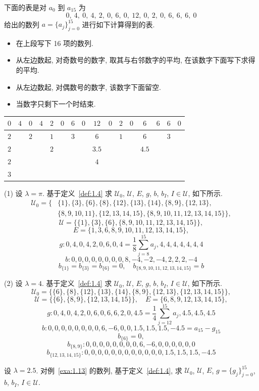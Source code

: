 \begin{example}\label{exa:1.13}
下面的表是对 $a_{0}$ 到 $a_{15}$ 为
\[
0, \ 4, \ 0, \ 4, \ 2, \ 0, \ 6, \ 0, \ 12, \ 0, \ 2, \ 0, \ 6, \ 6, \ 6, \ 0
\]
给出的数列 $a = \{a_{j}\}_{j=0}^{15}$ 进行如下计算得到的表.

\begin{itemize}
\item 在上段写下 16 项的数列.
\item 从左边数起, 对奇数号的数字, 取其与右邻数字的平均, 在该数字下面写下求得的平均.
\item 从左边数起, 对偶数号的数字, 该数字下面留空.
\item 当数字只剩下一个时结束.
\end{itemize}

\begin{center}
\begin{tabular}{cccccccccccccccc}
\hline
$0$ & $4$ & $0$ & $4$ & $2$ & $0$ & $6$ & $0$ & $12$ & $0$ & $2$ & $0$ & $6$ & $6$ & $6$ & $0$ \\
\hline
$2$ &  & $2$ &  & $1$ &  & $3$ &  & $6$ &  & $1$ &  & $6$ &  & $3$ &  \\
\hline
$2$ &  &  &  & $2$ &  &  &  & $3.5$ &  &  &  & $4.5$ &  &  &  \\
\hline
$2$ &  &  &  &  &  &  &  & $4$ &  &  &  &  &  &  &  \\
\hline
$3$ &  &  &  &  &  &  &  &  &  &  &  &  &  &  &  \\
\hline
\end{tabular}
\end{center}

(1) 设 $\lambda = \pi$. 基于定义~\ref{def:1.4} 求 $\mathcal{U}_{0}$, $\mathcal{U}$, $E$, $g$, $b$, $b_{I}$, $I \in \mathcal{U}$, 如下所示.
\begin{align*}
\mathcal{U}_{0} = \{ & \{1\}, \{3\}, \{6\}, \{8\}, \{12\}, \{13\}, \{14\}, \{8,9\}, \{12,13\}, \\
& \{8,9,10,11\}, \{12,13,14,15\}, \{8,9,10,11,12,13,14,15\}\},
\end{align*}
\[
\mathcal{U} = \{\{1\}, \{3\}, \{6\}, \{8,9,10,11,12,13,14,15\}\},
\]
\[
E = \{1, 3, 6, 8, 9, 10, 11, 12, 13, 14, 15\},
\]
\[
g: 0, 4, 0, 4, 2, 0, 6, 0, 4 = \frac{1}{8}\sum_{j=8}^{15} a_{j}, 4, 4, 4, 4, 4, 4, 4
\]
\[
b: 0, 0, 0, 0, 0, 0, 0, 0, 8, -4, -2, -4, 2, 2, 2, -4
\]
\[
b_{\{1\}} = b_{\{3\}} = b_{\{6\}} = 0, \quad b_{\{8,9,10,11,12,13,14,15\}} = b
\]

(2) 设 $\lambda = 4$. 基于定义~\ref{def:1.4} 求 $\mathcal{U}_{0}$, $\mathcal{U}$, $E$, $g$, $b$, $b_{I}$, $I \in \mathcal{U}$, 如下所示.
\[
\mathcal{U}_{0} = \{\{6\}, \{8\}, \{12\}, \{13\}, \{14\}, \{8,9\}, \{12,13\}, \{12,13,14,15\}\},
\]
\[
\mathcal{U} = \{\{6\}, \{8,9\}, \{12,13,14,15\}\}, \quad E = \{6, 8, 9, 12, 13, 14, 15\},
\]
\[
g: 0, 4, 0, 4, 2, 0, 6, 0, 6, 6, 2, 0, 4.5 = \frac{1}{4}\sum_{j=12}^{15} a_{j}, 4.5, 4.5, 4.5
\]
\[
b: 0, 0, 0, 0, 0, 0, 0, 0, 6, -6, 0, 0, 1.5, 1.5, 1.5, -4.5 = a_{15} - g_{15}
\]
\[
b_{\{6\}} = 0,
\]
\[
b_{\{8,9\}}: 0, 0, 0, 0, 0, 0, 0, 0, 6, -6, 0, 0, 0, 0, 0, 0
\]
\[
b_{\{12,13,14,15\}}: 0, 0, 0, 0, 0, 0, 0, 0, 0, 0, 0, 0, 1.5, 1.5, 1.5, -4.5
\]
\end{example}

\begin{exercise}\label{exer:1.21}
设 $\lambda = 2.5$. 对例~\ref{exa:1.13} 的数列, 基于定义~\ref{def:1.4}, 求 $\mathcal{U}_{0}$, $\mathcal{U}$, $E$, $g = \{g_{j}\}_{j=0}^{15}$, $b$, $b_{I}$, $I \in \mathcal{U}$.
\end{exercise}

